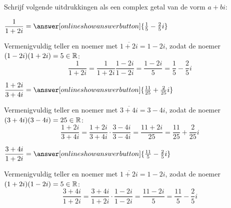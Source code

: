 \documentclass{ximera}
\begin{document}
\begin{exercise} Schrijf volgende uitdrukkingen als een complex getal van de vorm $a+bi$:
	\begin{question} $\dfrac{1}{1+2i} =  \answer[onlineshowanswerbutton]{\frac15 -\frac25 i}$
	\begin{oplossing}
	Vermenigvuldig teller en noemer met $\overline{1+2i} = 1-2i$, zodat de noemer $(1-2i)(1+2i) = 5\in\mathbb{R}$:
	$$
	\frac{1}{1+2i} = \frac{1}{1+2i} \frac{1-2i}{1-2i} = \frac{1-2i}{5}=\frac15 -\frac25 i
	$$
	\end{oplossing}
	\end{question}
    \begin{question} $\dfrac{1+2i}{3+4i} =  \answer[onlineshowanswerbutton]{\frac{11}{25} + \frac{2}{25}i}$
    \begin{oplossing}
	Vermenigvuldig teller en noemer met $\overline{3+4i} = 3-4i$, zodat de noemer $(3+4i)(3-4i) = 25\in\mathbb{R}$:  
	$$
	\frac{1+2i}{3+4i} = \frac{1+2i}{3+4i} \cdot \frac{3-4i}{3-4i} = \frac{11 + 2i}{25}= \frac{11}{25} + \frac{2}{25}i
	$$
    \end{oplossing}
    \end{question}	
    \begin{question} $\dfrac{3+4i}{1+2i} =  \answer[onlineshowanswerbutton]{\frac{11}{5}-\frac{2}{5}i}$
    \begin{oplossing}
	Vermenigvuldig teller en noemer met $\overline{1+2i} = 1-2i$, zodat de noemer $(1+2i)(1-2i) = 5\in\mathbb{R}$:
	$$
	\frac{3+4i}{1+2i} = \frac{3+4i}{1+2i} \cdot \frac{1-2i}{1-2i} = \frac{11 - 2i}{5}=\frac{11}{5}-\frac{2}{5}i
	$$ 	
    \end{oplossing}
    \end{question}	
\end{exercise}
\end{document}
